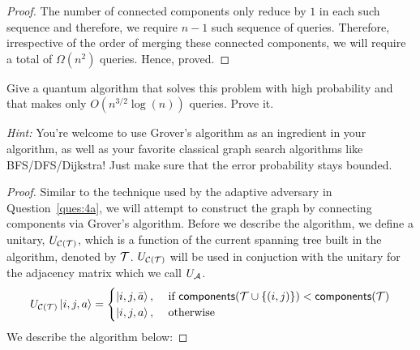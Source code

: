 \begin{solution}[label=ques:4a]
\begin{proof}[Proof]
    The number of connected components only reduce by $1$ in each such sequence and therefore, we require $n-1$ such sequence of queries. Therefore, irrespective of the order of merging these connected components, we will require a total of $\Omega(n^2)$ queries. Hence, proved.
  \end{proof}
\end{solution}

\begin{solution}[label=ques:4b]
  \begin{question}
    Give a quantum algorithm that solves this problem with high probability and that makes only $O(n^{3/2} \log{(n)})$ queries. Prove it.

\noindent \emph{Hint:} You're welcome to use Grover's algorithm as an ingredient in your algorithm, as well as your favorite classical graph search algorithms like BFS/DFS/Dijkstra!  Just make sure that the error probability stays bounded.
  \end{question}
  \tcblower{}
  \begin{proof}[Proof]
    Similar to the technique used by the adaptive adversary in Question~\ref{ques:4a}, we will attempt to construct the graph by connecting components via Grover's algorithm. Before we describe the algorithm, we define a unitary, $U_{\mathcal{C}(\mathcal{T})}$, which is a function of the current spanning tree built in the algorithm, denoted by $\mathcal{T}$. $U_{\mathcal{C}(\mathcal{T})}$ will be used in conjuction with the unitary for the adjacency matrix which we call $U_{\mathcal{A}}$.
    \begin{equation}
      U_{\mathcal{C}(\mathcal{T})}\ket{i, j, a} =
      \begin{cases}
        \ket{i, j, \bar{a}}, &\text{ if }\mathsf{components}(\mathcal{T}\cup \{(i, j)\}) < \mathsf{components}(\mathcal{T})\\
        \ket{i, j, a}, &\text{ otherwise}
      \end{cases}
      \label{eq:connectunitary}
    \end{equation}
    We describe the algorithm below:
\end{proof}
\end{solution}
